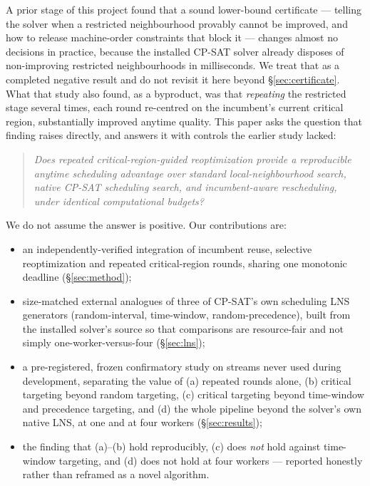 \documentclass[letterpaper]{article} %
\begin{document}
A prior stage of this project found that a sound lower-bound certificate --- telling the solver when a restricted neighbourhood provably cannot be improved, and how to release machine-order constraints that block it --- changes almost no decisions in practice, because the installed CP-SAT solver already disposes of non-improving restricted neighbourhoods in milliseconds. We treat that as a completed negative result and do not revisit it here beyond \S\ref{sec:certificate}. What that study also found, as a byproduct, was that \emph{repeating} the restricted stage several times, each round re-centred on the incumbent's current critical region, substantially improved anytime quality. This paper asks the question that finding raises directly, and answers it with controls the earlier study lacked:

\begin{quote}
\emph{Does repeated critical-region-guided reoptimization provide a reproducible anytime scheduling advantage over standard local-neighbourhood search, native CP-SAT scheduling search, and incumbent-aware rescheduling, under identical computational budgets?}
\end{quote}

We do not assume the answer is positive. Our contributions are:
\begin{itemize}
\item an independently-verified integration of incumbent reuse, selective reoptimization and repeated critical-region rounds, sharing one monotonic deadline (\S\ref{sec:method});
\item size-matched external analogues of three of CP-SAT's own scheduling LNS generators (random-interval, time-window, random-precedence), built from the installed solver's source so that comparisons are resource-fair and not simply one-worker-versus-four (\S\ref{sec:lns});
\item a pre-registered, frozen confirmatory study on streams never used during development, separating the value of (a) repeated rounds alone, (b) critical targeting beyond random targeting, (c) critical targeting beyond time-window and precedence targeting, and (d) the whole pipeline beyond the solver's own native LNS, at one and at four workers (\S\ref{sec:results});
\item the finding that (a)--(b) hold reproducibly, (c) does \emph{not} hold against time-window targeting, and (d) does not hold at four workers --- reported honestly rather than reframed as a novel algorithm.
\end{itemize}
\end{document}
